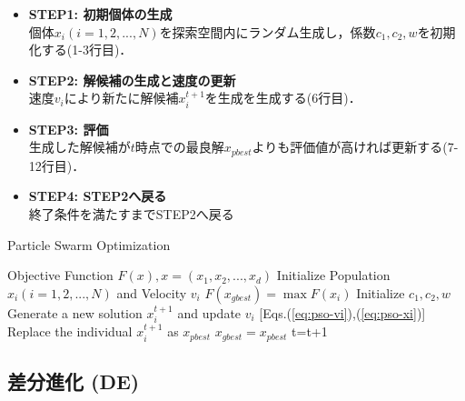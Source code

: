 \documentclass[a4j,11pt]{jarticle}
\begin{document}
\begin{itemize}
\item {\bf STEP1: 初期個体の生成}\\
個体$x_i (i=1,2,...,N)$を探索空間内にランダム生成し，係数$c_1,c_2, w$を初期化する(1-3行目)．
\item {\bf STEP2: 解候補の生成と速度の更新}\\
速度$v_i$により新たに解候補$x_i^{t+1}$を生成を生成する(6行目)．
\item {\bf STEP3: 評価}\\
生成した解候補が$t$時点での最良解$x_{pbest}$よりも評価値が高ければ更新する(7-12行目)．
\item {\bf STEP4: STEP2へ戻る}\\
終了条件を満たすまでSTEP2へ戻る
\end{itemize}

\begin{algorithm}[H]
\caption{Particle Swarm Optimization}
\label{code:pso}
\begin{algorithmic}[2]
\REQUIRE Objective Function $F(x), x=(x_1,x_2,...,x_d)$
\STATE Initialize Population $x_i (i=1,2,...,N)$ and Velocity $v_i$
\STATE $F(x_{gbest})=\max{F(x_i)}$
\STATE Initialize $c_1,c_2,w$
\STATE Generate a new solution $x_i^{t+1}$ and update $v_i$ [Eqs.(\ref{eq:pso-vi}),(\ref{eq:pso-xi})]
\STATE Replace the individual $x_i^{t+1}$ as $x_{pbest}$
\ENDIF
{}
\STATE $x_{gbest}=x_{pbest}$
\ENDIF
\ENDFOR
\STATE t=t+1
\ENDWHILE
\end{algorithmic}
\end{algorithm}

\subsection{差分進化 (DE)}
\label{ss:DE}

\end{document}
